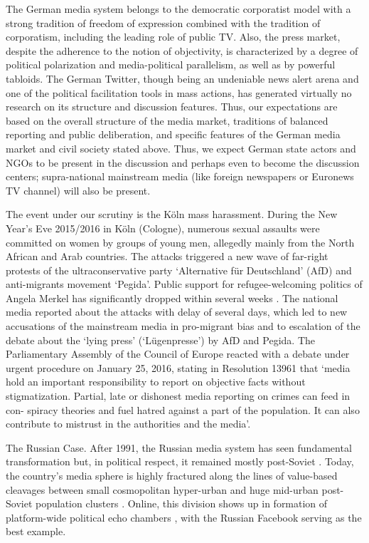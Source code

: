 The German media system belongs to the democratic corporatist model \cite{HallinMancini} with a strong tradition of freedom of expression combined with the tradition of corporatism, including the leading role of public TV. Also, the press market, despite the adherence to the notion of objectivity, is characterized by a degree of political polarization and media-political parallelism, as well as by powerful tabloids. The German Twitter, though being an undeniable news alert arena and one of the political facilitation tools in mass actions, has generated virtually no research on its structure and discussion features. Thus, our expectations are based on the overall structure of the media market, traditions of balanced reporting and public deliberation, and specific features of the German media market and civil society stated above. Thus, we expect German state actors and NGOs to be present in the discussion and perhaps even to become the discussion centers; supra-national mainstream media (like foreign newspapers or Euronews TV channel) will also be present.

The event under our scrutiny is the Köln mass harassment. During the New Year’s Eve 2015/2016 in Köln (Cologne), numerous sexual assaults were committed on women by groups of young men, allegedly mainly from the North African and Arab countries. The attacks triggered a new wave of far-right protests of the ultraconservative party ‘Alternative für Deutschland’ (AfD) and anti-migrants movement ‘Pegida’. Public support for refugee-welcoming politics of Angela Merkel has significantly dropped within several weeks \cite{Dearden}. The national media reported about the attacks with delay of several days, which led to new accusations of the mainstream media in pro-migrant bias and to escalation of the debate about the ‘lying press’ (‘Lügenpresse’) by AfD and Pegida. The Parliamentary Assembly of the Council of Europe reacted with a debate under urgent procedure on January 25, 2016, stating in Resolution 13961 that ‘media hold an important responsibility to report on objective facts without stigmatization. Partial, late or dishonest media reporting on crimes can feed in con- spiracy theories and fuel hatred against a part of the population. It can also contribute to mistrust in the authorities and the media’.

The Russian Case. After 1991, the Russian media system has seen fundamental transformation but, in political respect, it remained mostly post-Soviet \cite{Vartanova}. Today, the country’s media sphere is highly fractured along the lines of value-based cleavages between small cosmopolitan hyper-urban and huge mid-urban post-Soviet population clusters \cite{BodrunovaLitvinenko2013,BodrunovaLitvinenkoGavraYakunin}. Online, this division shows up in formation of platform-wide political echo chambers \cite{BodrunovaLitvinenkoGavraYakunin}, with the Russian Facebook serving as the best example.

